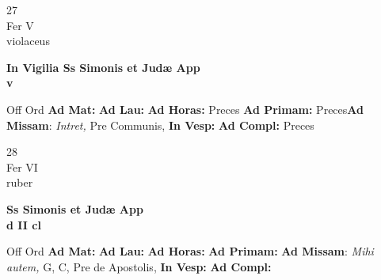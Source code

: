 \documentclass[10pt, openany]{book}
\begin{document}
        \begin{center}
            \begin{minipage}{3.5in}
                \vspace{2em}
                \begin{minipage}{0.5in}
                    {\Huge 27} \\
                    {\normalsize Fer V} \\
                    {\normalsize violaceus}
                \end{minipage}
                \begin{minipage}{3.0in}
                    \textbf{ \large In Vigilia Ss Simonis et Judæ App \\
                    \textnormal{\normalsize v}} \\ 
                \end{minipage}
                \begin{justify}Off Ord
                    \textbf{Ad Mat: }
                    \textbf{Ad Lau: }
                    \textbf{Ad Horas: }Preces
                    \textbf{Ad Primam: }Preces\textbf{Ad Missam}: \textit{Intret,} Pre Communis,  
                    \textbf{In Vesp: }
                    \textbf{Ad Compl: }Preces
                \end{justify}
            \end{minipage}
        \end{center}
    
        \begin{center}
            \begin{minipage}{3.5in}
                \vspace{2em}
                \begin{minipage}{0.5in}
                    {\Huge 28} \\
                    {\normalsize Fer VI} \\
                    {\normalsize ruber}
                \end{minipage}
                \begin{minipage}{3.0in}
                    \textbf{ \large Ss Simonis et Judæ App \\
                    \textnormal{\normalsize d II cl}} \\ 
                \end{minipage}
                \begin{justify}Off Ord
                    \textbf{Ad Mat: }
                    \textbf{Ad Lau: }
                    \textbf{Ad Horas: }
                    \textbf{Ad Primam: }\textbf{Ad Missam}: \textit{Mihi autem,} G, C, Pre de Apostolis,  
                    \textbf{In Vesp: }
                    \textbf{Ad Compl: }
                \end{justify}
            \end{minipage}
        \end{center}
    
\end{document}
